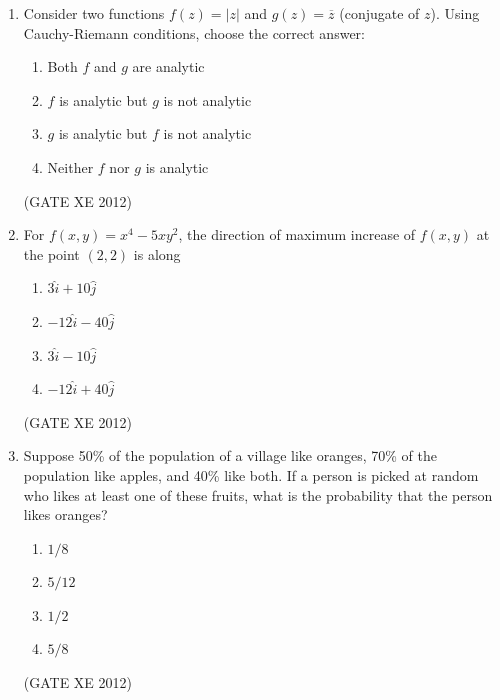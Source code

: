 \documentclass[12pt]{article}
\begin{document}
\begin{enumerate}
(GATE XE 2012)

\item Consider two functions $f(z) = |z|$ and $g(z) = \overline{z}$ (conjugate of $z$).  
Using Cauchy-Riemann conditions, choose the correct answer:  

\begin{multicols}{2}
\begin{enumerate}
\item Both $f$ and $g$ are analytic  
\item $f$ is analytic but $g$ is not analytic  
\item $g$ is analytic but $f$ is not analytic  
\item Neither $f$ nor $g$ is analytic
\end{enumerate}
\end{multicols}

(GATE XE 2012)

\item For $f(x,y) = x^4 - 5xy^2$, the direction of maximum increase of $f(x,y)$ at the point $(2,2)$ is along  

\begin{multicols}{4}
\begin{enumerate}
\item $3\hat{i} + 10\hat{j}$  
\item $-12\hat{i} - 40\hat{j}$  
\item $3\hat{i} - 10\hat{j}$  
\item $-12\hat{i} + 40\hat{j}$
\end{enumerate}
\end{multicols}

(GATE XE 2012)

\item Suppose 50\% of the population of a village like oranges, 70\% of the population like apples, and 40\% like both.  
If a person is picked at random who likes at least one of these fruits, what is the probability that the person likes oranges?  

\begin{multicols}{4}
\begin{enumerate}
\item $1/8$  
\item $5/12$  
\item $1/2$  
\item $5/8$
\end{enumerate}
\end{multicols}

(GATE XE 2012)


\end{enumerate}
\end{document}
